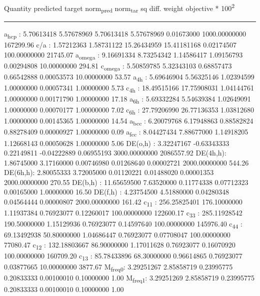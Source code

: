 \documentclass[11pt]{article}
\begin{document}
Quantity      predicted    target     norm\textsubscript{pred}   norm\textsubscript{tar}    sq diff.      weight    objective * 100\textsuperscript{2} 

\noindent\rule{\textwidth}{0.5pt}
a\textsubscript{hcp}   :   5.70613418   5.57678969   5.70613418   5.57678969   0.01673000 1000.00000000    167299.96
c/a     :   1.57212363   1.58731122  15.26434959  15.41181168   0.02174507 100.00000000     21745.07
a\textsubscript{omega} :   9.16691334   8.73254342   1.14586417   1.09156793   0.00294808  10.00000000       294.81
c\textsubscript{omega} :   5.50859785   5.32343103   0.68857473   0.66542888   0.00053573  10.00000000        53.57
a\textsubscript{4h}    :   5.69646904   5.56325146   1.02394599   1.00000000   0.00057341   1.00000000         5.73
c\textsubscript{4h}    :  18.49515166  17.75908031   1.04144761   1.00000000   0.00171790   1.00000000        17.18
a\textsubscript{6h}    :   5.69332284   5.54639384   1.02649091   1.00000000   0.00070177   1.00000000         7.02
c\textsubscript{6h}    :  27.79206990  26.77136353   1.03812680   1.00000000   0.00145365   1.00000000        14.54
a\textsubscript{bcc}   :   6.20079768   6.17948863   0.88582824   0.88278409   0.00000927   1.00000000         0.09
a\textsubscript{fcc}   :   8.04427434   7.88677000   1.14918205   1.12668143   0.00050628   1.00000000         5.06
DE(o,h) :   3.32247167  -0.63343333   0.22149811  -0.04222889   0.06955193 3000.00000000   2086557.92
DE(4h,h):   1.86745000   3.17160000   0.00746980   0.01268640   0.00002721 2000.00000000       544.26
DE(6h,h):   2.80055333   3.72005000   0.01120221   0.01488020   0.00001353 2000.00000000       270.55
DE(b,h) :  11.65659500   7.63520000   0.11774338   0.07712323   0.00165000   1.00000000        16.50
DE(f,h) :   4.23754500   4.51880000   0.04280348   0.04564444   0.00000807 2000.00000000       161.42
c\textsubscript{11}    : 256.25825401 176.10000000   1.11937384   0.76923077   0.12260017 100.00000000    122600.17
c\textsubscript{33}    : 285.11928542 190.50000000   1.15129936   0.76923077   0.14597640 100.00000000    145976.40
c\textsubscript{44}    :  69.13492938  50.80000000   1.04686447   0.76923077   0.07708047 100.00000000     77080.47
c\textsubscript{12}    : 132.18803667  86.90000000   1.17011628   0.76923077   0.16070920 100.00000000    160709.20
c\textsubscript{13}    :  85.78433896  68.30000000   0.96614865   0.76923077   0.03877665  10.00000000      3877.67
M\textsubscript{freq}\textsubscript{0}:   3.29251267   2.85858719   0.23995775   0.20833333   0.00100010   0.10000000         1.00
M\textsubscript{freq}\textsubscript{1}:   3.29251269   2.85858719   0.23995775   0.20833333   0.00100010   0.10000000         1.00
\end{document}
